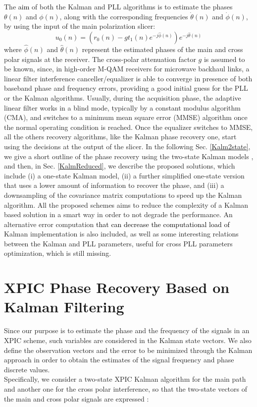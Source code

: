 The \textcolor{black}{aim} of both the Kalman and PLL algorithms is to estimate the phases ${\theta}(n)$ and  ${\phi}(n)$, along with the corresponding frequencies ${\dot{\theta}}(n)$ and ${\dot{\phi}}(n)$, by using the input of the main polarization slicer:
\begin{equation}
u_0(n)=\left(r_0(n)-gt_1(n)e^{-j\hat{\phi}(n)}\right)e^{-j\hat{\theta}(n)}
\label{outsig}
\end{equation}
where $\hat{\phi}(n)$ and $\hat{\theta}(n)$ represent the estimated phases of the main and cross polar signals at the receiver.
The cross-polar attenuation factor $\mathit{g}$ is assumed to be known, since, in high-order M-QAM receivers for microwave backhaul links, a linear filter interference canceller/equalizer is able to converge in presence of both baseband phase and frequency errors, providing a good initial guess for the PLL or the Kalman algorithms. Usually, during the acquisition phase, the adaptive linear filter works in a blind mode, typically by a constant modulus algorithm (CMA), and switches to a minimum mean square error (MMSE) algorithm once the normal operating condition is reached. Once the equalizer switches to MMSE, all the others recovery algorithms, like the Kalman phase recovery one, start using the decisions at the output of the slicer. 
In the following Sec. \ref{Kalm2state}, we give a short outline of the phase recovery using the two-state Kalman models \cite{CommLett}, and then, in Sec. \ref{KalmReduced}, we describe the proposed solutions, which include (i) a one-state Kalman model, (ii) a further simplified one-state version that uses a lower amount of information to recover the phase, and (iii) a downsampling of the covariance matrix computations to speed up the Kalman algorithm. All the proposed schemes aims to reduce the complexity of a Kalman based solution in a smart way in order to not degrade the performance. An alternative error computation \textcolor{black}{that can decrease the computational load of} Kalman implementation is also included, as well as some interesting relations between the Kalman and PLL parameters, useful for cross PLL parameters optimization, which is still missing.

\section{XPIC Phase Recovery Based on Kalman Filtering}

Since our purpose is to estimate the phase and the frequency of the signals in an XPIC scheme, such variables are considered in the Kalman state vectors.
We also define the observation vectors and the error to be minimized through the Kalman approach in order to obtain the estimates of the signal frequency and phase discrete values.\\	
Specifically, we consider a two-state XPIC Kalman algorithm for the main path and another one for the cross polar interference, so that the two-state vectors of the main and cross polar signals are expressed \cite{CommLett}:


